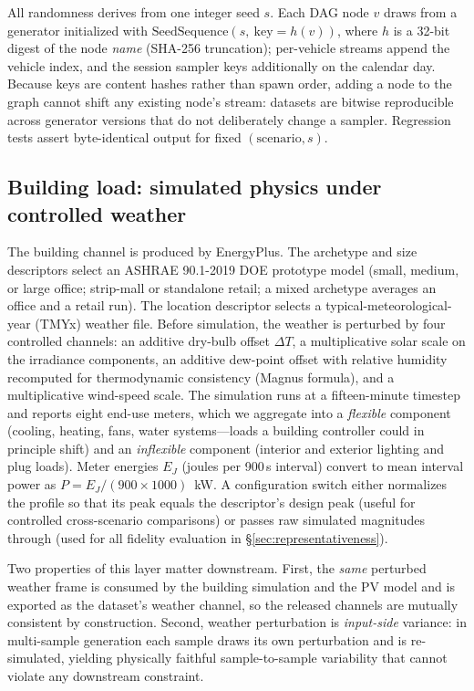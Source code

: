 All randomness derives from one integer seed $s$. Each DAG node $v$ draws from
a generator initialized with
$\mathrm{SeedSequence}(s,\ \mathrm{key}=h(v))$, where $h$ is a 32-bit digest
of the node \emph{name} (SHA-256 truncation); per-vehicle streams append the
vehicle index, and the session sampler keys additionally on the calendar day.
Because keys are content hashes rather than spawn order, adding a node to the
graph cannot shift any existing node's stream: datasets are bitwise
reproducible across generator versions that do not deliberately change a
sampler. Regression tests assert byte-identical output for fixed
$(\text{scenario}, s)$.

\subsection{Building load: simulated physics under controlled weather}
\label{sec:building}

The building channel is produced by EnergyPlus. The archetype and size
descriptors select an ASHRAE 90.1-2019 DOE prototype model (small, medium, or
large office; strip-mall or standalone retail; a mixed archetype averages an
office and a retail run). The location descriptor selects a
typical-meteorological-year (TMYx) weather file. Before simulation, the
weather is perturbed by four controlled channels: an additive dry-bulb offset
$\Delta T$, a multiplicative solar scale on the irradiance components, an
additive dew-point offset with relative humidity recomputed for thermodynamic
consistency (Magnus formula), and a multiplicative wind-speed scale. The
simulation runs at a fifteen-minute timestep and reports eight end-use meters,
which we aggregate into a \emph{flexible} component (cooling, heating, fans,
water systems---loads a building controller could in principle shift) and an
\emph{inflexible} component (interior and exterior lighting and plug loads).
Meter energies $E_J$ (joules per 900\,s interval) convert to mean interval
power as $P = E_J / (900 \times 1000)$~kW. A configuration switch either
normalizes the profile so that its peak equals the descriptor's design peak
(useful for controlled cross-scenario comparisons) or passes raw simulated
magnitudes through (used for all fidelity evaluation in
\S\ref{sec:representativeness}).

Two properties of this layer matter downstream. First, the \emph{same}
perturbed weather frame is consumed by the building simulation and the PV
model and is exported as the dataset's weather channel, so the released
channels are mutually consistent by construction. Second, weather perturbation
is \emph{input-side} variance: in multi-sample generation each sample draws
its own perturbation and is re-simulated, yielding physically faithful
sample-to-sample variability that cannot violate any downstream constraint.

